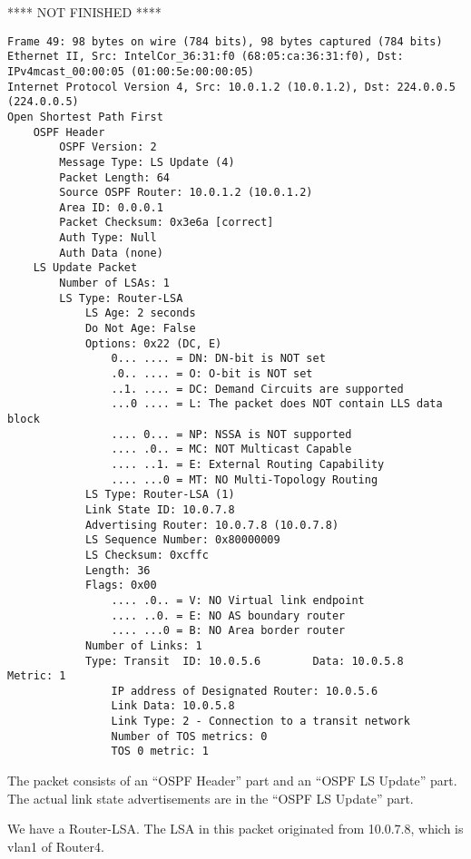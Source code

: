 \fi

**** NOT FINISHED ****

\begin{lstlisting}
Frame 49: 98 bytes on wire (784 bits), 98 bytes captured (784 bits)
Ethernet II, Src: IntelCor_36:31:f0 (68:05:ca:36:31:f0), Dst: IPv4mcast_00:00:05 (01:00:5e:00:00:05)
Internet Protocol Version 4, Src: 10.0.1.2 (10.0.1.2), Dst: 224.0.0.5 (224.0.0.5)
Open Shortest Path First
    OSPF Header
        OSPF Version: 2
        Message Type: LS Update (4)
        Packet Length: 64
        Source OSPF Router: 10.0.1.2 (10.0.1.2)
        Area ID: 0.0.0.1
        Packet Checksum: 0x3e6a [correct]
        Auth Type: Null
        Auth Data (none)
    LS Update Packet
        Number of LSAs: 1
        LS Type: Router-LSA
            LS Age: 2 seconds
            Do Not Age: False
            Options: 0x22 (DC, E)
                0... .... = DN: DN-bit is NOT set
                .0.. .... = O: O-bit is NOT set
                ..1. .... = DC: Demand Circuits are supported
                ...0 .... = L: The packet does NOT contain LLS data block
                .... 0... = NP: NSSA is NOT supported
                .... .0.. = MC: NOT Multicast Capable
                .... ..1. = E: External Routing Capability
                .... ...0 = MT: NO Multi-Topology Routing
            LS Type: Router-LSA (1)
            Link State ID: 10.0.7.8
            Advertising Router: 10.0.7.8 (10.0.7.8)
            LS Sequence Number: 0x80000009
            LS Checksum: 0xcffc
            Length: 36
            Flags: 0x00
                .... .0.. = V: NO Virtual link endpoint
                .... ..0. = E: NO AS boundary router
                .... ...0 = B: NO Area border router
            Number of Links: 1
            Type: Transit  ID: 10.0.5.6        Data: 10.0.5.8        Metric: 1
                IP address of Designated Router: 10.0.5.6
                Link Data: 10.0.5.8
                Link Type: 2 - Connection to a transit network
                Number of TOS metrics: 0
                TOS 0 metric: 1
\end{lstlisting}

The packet consists of an ``OSPF Header'' part and an ``OSPF LS Update'' part. The actual link state advertisements are in the ``OSPF LS Update'' part.

We have a Router-LSA.
The LSA in this packet originated from 10.0.7.8, which is vlan1 of Router4.
